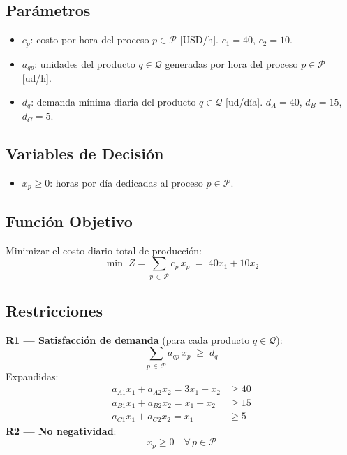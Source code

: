 \documentclass[12pt,a4paper]{article}
\newcommand{\cset}[1]{\mathcal{#1}}            %
\begin{document}
\subsection{Parámetros}

\begin{parambox}
\begin{itemize}[leftmargin=1.5em]
  \item $c_p$: costo por hora del proceso $p \in \mathcal{P}$ [USD/h]. $c_1 = 40$, $c_2 = 10$.
  \item $a_{qp}$: unidades del producto $q \in \mathcal{Q}$ generadas por hora del proceso $p \in \mathcal{P}$ [ud/h].
  \item $d_q$: demanda mínima diaria del producto $q \in \mathcal{Q}$ [ud/día]. $d_A=40$, $d_B=15$, $d_C=5$.
\end{itemize}
\end{parambox}

\subsection{Variables de Decisión}

\begin{varbox}
\begin{itemize}[leftmargin=1.5em]
  \item $x_p \geq 0$: horas por día dedicadas al proceso $p \in \mathcal{P}$.
\end{itemize}
\end{varbox}

\subsection{Función Objetivo}

\begin{fobox}
Minimizar el costo diario total de producción:
\[
  \min\; Z = \sum_{p\,\in\,\cset{P}} c_p\, x_p
  \;=\; 40x_1 + 10x_2
\]
\end{fobox}

\subsection{Restricciones}

\begin{restbox}
\textbf{R1 — Satisfacción de demanda} (para cada producto $q \in \cset{Q}$):
\[
  \sum_{p\,\in\,\cset{P}} a_{qp}\,x_p \;\geq\; d_q
\]
Expandidas:
\begin{align*}
  a_{A1}x_1 + a_{A2}x_2 = 3x_1 + x_2 &\geq 40 \tag{R1-A}\\
  a_{B1}x_1 + a_{B2}x_2 = x_1 + x_2  &\geq 15 \tag{R1-B}\\
  a_{C1}x_1 + a_{C2}x_2 = x_1         &\geq 5  \tag{R1-C}
\end{align*}
\textbf{R2 — No negatividad}:
\[
  x_p \geq 0 \quad \forall\, p \in \cset{P}
\]
\end{restbox}
\end{document}
